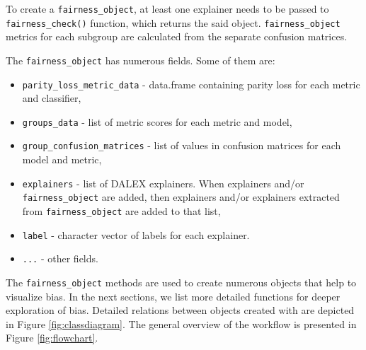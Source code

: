 To create a \texttt{fairness\_object}, at least one explainer needs to
be passed to \texttt{fairness\_check()} function, which returns the said
object. \texttt{fairness\_object} metrics for each subgroup are
calculated from the separate confusion matrices.

The \texttt{fairness\_object} has numerous fields. Some of them are:

\begin{itemize}
\tightlist
\item
  \texttt{parity\_loss\_metric\_data} - data.frame containing parity
  loss for each metric and classifier,
\item
  \texttt{groups\_data} - list of metric scores for each metric and
  model,
\item
  \texttt{group\_confusion\_matrices} - list of values in confusion
  matrices for each model and metric,
\item
  \texttt{explainers} - list of DALEX explainers. When explainers and/or
  \texttt{fairness\_object} are added, then explainers and/or explainers
  extracted from \texttt{fairness\_object} are added to that list,
\item
  \texttt{label} - character vector of labels for each explainer.
\item
  \texttt{...} - other fields.
\end{itemize}

The \texttt{fairness\_object} methods are used to create numerous
objects that help to visualize bias. In the next sections, we list more
detailed functions for deeper exploration of bias. Detailed relations
between objects created with  are depicted in Figure
\ref{fig:classdiagram}. The general overview of the workflow is
presented in Figure \ref{fig:flowchart}.

